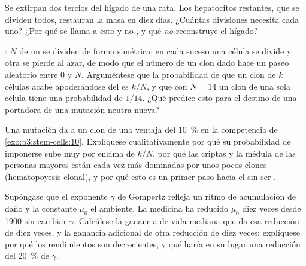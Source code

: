\begin{exercise}[$\star\star$]\label{exo:b3:stem-cells:9}
Se extirpan dos tercios del hígado de una rata. Los hepatocitos
restantes, que se dividen todos, restauran la masa en diez días.
¿Cuántas divisiones necesita cada uno? ¿Por qué se llama a esto
 y no , y qué \emph{no} reconstruye
el hígado?
\end{exercise}

\begin{exercise}[$\star\star\star$]\label{exo:b3:stem-cells:10}
: $N$  de un  se dividen de forma
simétrica; en cada suceso una célula se divide y otra se pierde al
azar, de modo que el número de un clon dado hace un paseo aleatorio
entre $0$ y $N$. Arguméntese que la probabilidad de que un clon de $k$
células acabe apoderándose del  es $k/N$, y que con $N = 14$ un
clon de una sola célula tiene una probabilidad de $1/14$. ¿Qué predice
esto para el destino de una  portadora de una mutación
neutra nueva?
\end{exercise}

\begin{exercise}[$\star\star\star$]\label{exo:b3:stem-cells:11}
Una mutación da a un clon de  una ventaja del \qty{10}{\%}
en la competencia de \cref{exo:b3:stem-cells:10}. Explíquese
cualitativamente por qué su probabilidad de imponerse sube muy por
encima de $k/N$, por qué las criptas y la médula de las personas
mayores están cada vez más dominadas por unos pocos clones
(hematopoyesis clonal), y por qué esto es un primer paso hacia el
 sin ser .
\end{exercise}

\begin{exercise}[$\star\star\star$]\label{exo:b3:stem-cells:12}
Supóngase que el exponente $\gamma$ de Gompertz refleja un ritmo de
acumulación de daño y la constante $\mu_{0}$ el ambiente. La medicina
ha reducido $\mu_{0}$ diez veces desde 1900 sin cambiar $\gamma$.
Calcúlese la ganancia de vida mediana que da esa reducción de diez
veces, y la ganancia adicional de otra reducción de diez veces;
explíquese por qué los rendimientos son decrecientes, y qué haría en su
lugar una reducción del \qty{20}{\%} de $\gamma$.
\end{exercise}

